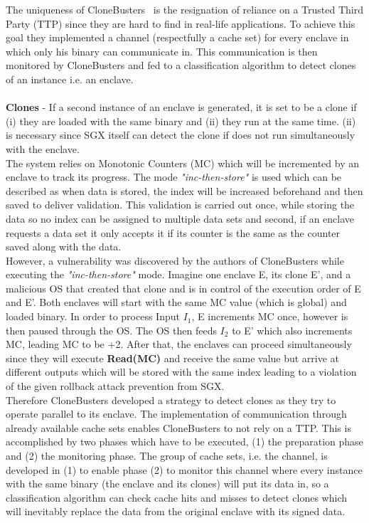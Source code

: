 The uniqueness of CloneBusters~\cite{nfw} is the resignation of reliance on a Trusted Third Party (TTP) since they are hard to find in real-life applications. To achieve this goal they implemented a channel (respectfully a cache set) for every enclave in which only his binary can communicate in. This communication is then monitored by CloneBusters and fed to a classification algorithm to detect clones of an instance i.e. an enclave. \\
\\
\textbf{Clones} - If a second instance of an enclave is generated, it is set to be a clone if (i) they are loaded with the same binary and (ii) they run at the same time. (ii) is necessary since SGX itself can detect the clone if does not run simultaneously with the enclave. \\

The system relies on Monotonic Counters (MC) which will be incremented by an enclave to track its progress. The mode \textit{"inc-then-store"} is used which can be described as when data is stored, the index will be increased beforehand and then saved to deliver validation. This validation is carried out once, while storing the data so no index can be assigned to multiple data sets and second, if an enclave requests a data set it only accepts it if its counter is the same as the counter saved along with the data.\\
However, a vulnerability was discovered by the authors of CloneBusters while executing the \textit{"inc-then-store"} mode. Imagine one enclave E, its clone E', and a malicious OS that created that clone and is in control of the execution order of E and E'. Both enclaves will start with the same MC value (which is global) and loaded binary. In order to process Input \(I_1\), E increments MC once, however is then paused through the OS. The OS then feeds \(I_2\) to E' which also increments MC, leading MC to be +2. After that, the enclaves can proceed simultaneously since they will execute \textbf{Read(MC)} and receive the same value but arrive at different outputs which will be stored with the same index leading to a violation of the given rollback attack prevention from SGX. \\
Therefore CloneBusters developed a strategy to detect clones as they try to operate parallel to its enclave. The implementation of communication through already available cache sets enables CloneBusters to not rely on a TTP. This is accomplished by two phases which have to be executed, (1) the preparation phase and (2) the monitoring phase. The group of cache sets, i.e. the channel, is developed in (1) to enable phase (2) to monitor this channel where every instance with the same binary (the enclave and its clones) will put its data in, so a classification algorithm can check cache hits and misses to detect clones which will inevitably replace the data from the original enclave with its signed data.


